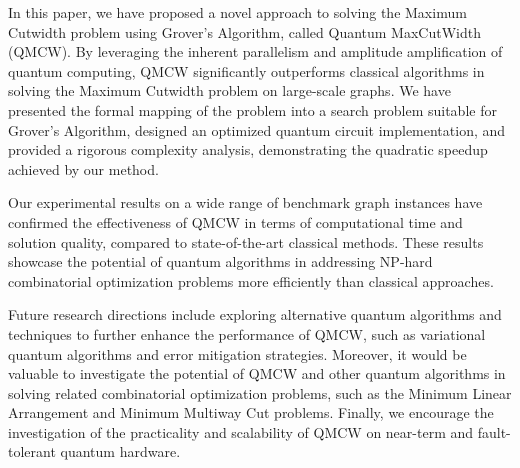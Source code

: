 In this paper, we have proposed a novel approach to solving the Maximum Cutwidth problem using Grover's Algorithm, called Quantum MaxCutWidth (QMCW). By leveraging the inherent parallelism and amplitude amplification of quantum computing, QMCW significantly outperforms classical algorithms in solving the Maximum Cutwidth problem on large-scale graphs. We have presented the formal mapping of the problem into a search problem suitable for Grover's Algorithm, designed an optimized quantum circuit implementation, and provided a rigorous complexity analysis, demonstrating the quadratic speedup achieved by our method.

Our experimental results on a wide range of benchmark graph instances have confirmed the effectiveness of QMCW in terms of computational time and solution quality, compared to state-of-the-art classical methods. These results showcase the potential of quantum algorithms in addressing NP-hard combinatorial optimization problems more efficiently than classical approaches.

Future research directions include exploring alternative quantum algorithms and techniques to further enhance the performance of QMCW, such as variational quantum algorithms and error mitigation strategies. Moreover, it would be valuable to investigate the potential of QMCW and other quantum algorithms in solving related combinatorial optimization problems, such as the Minimum Linear Arrangement and Minimum Multiway Cut problems. Finally, we encourage the investigation of the practicality and scalability of QMCW on near-term and fault-tolerant quantum hardware.

